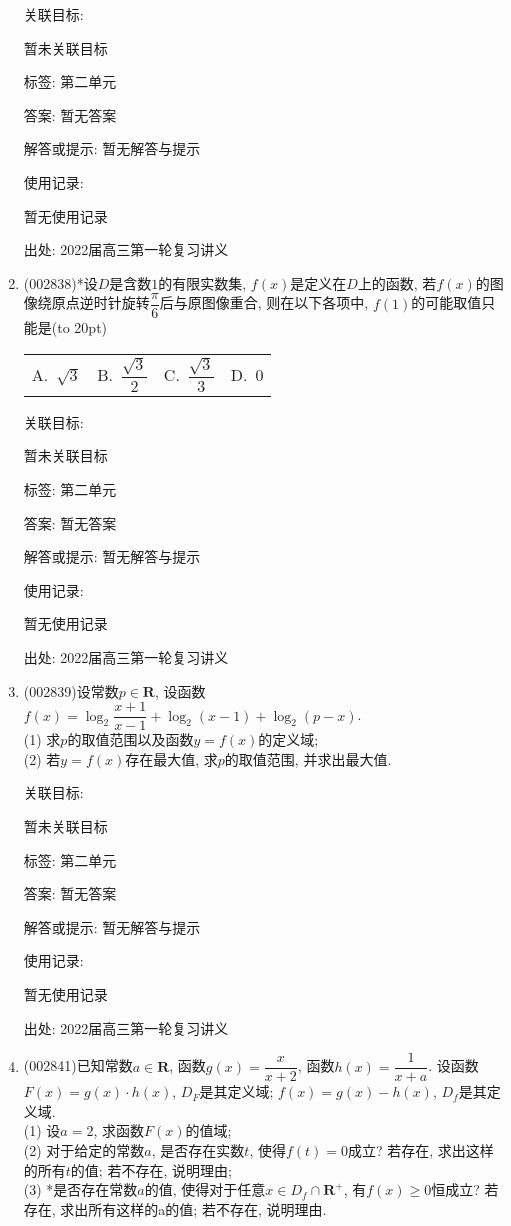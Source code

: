 \documentclass[10pt,a4paper]{article}
\newcommand{\bracket}[1]{(\hbox to #1pt{})}
\newcommand{\fourch}[4]{\par\begin{tabular}{p{.23\textwidth}p{.23\textwidth}p{.23\textwidth}p{.23\textwidth}}
A.~#1 &B.~#2& C.~#3& D.~#4
\end{tabular}}
\begin{document}
\begin{enumerate}[1.]
关联目标:

暂未关联目标



标签: 第二单元

答案: 暂无答案

解答或提示: 暂无解答与提示

使用记录:

暂无使用记录


出处: 2022届高三第一轮复习讲义
\item { (002838)}*设$D$是含数$1$的有限实数集, $f(x)$是定义在$D$上的函数, 若$f(x)$的图像绕原点逆时针旋转$\dfrac \pi6$后与原图像重合, 则在以下各项中, $f(1)$的可能取值只能是\bracket{20}
\fourch{$\sqrt3$}{$\dfrac{\sqrt{3}}2$}{$\dfrac{\sqrt{3}}3$}{$0$}


关联目标:

暂未关联目标



标签: 第二单元

答案: 暂无答案

解答或提示: 暂无解答与提示

使用记录:

暂无使用记录


出处: 2022届高三第一轮复习讲义
\item { (002839)}设常数$p\in \mathbf{R}$, 设函数$f(x)=\log_2\dfrac{x+1}{x-1}+\log_2(x-1)+\log_2(p-x)$.\\
(1) 求$p$的取值范围以及函数$y=f(x)$的定义域;\\
(2) 若$y=f(x)$存在最大值, 求$p$的取值范围, 并求出最大值.


关联目标:

暂未关联目标



标签: 第二单元

答案: 暂无答案

解答或提示: 暂无解答与提示

使用记录:

暂无使用记录


出处: 2022届高三第一轮复习讲义
\item { (002841)}已知常数$a\in \mathbf{R}$, 函数$g(x)=\dfrac x{x+2}$, 函数$h(x)=\dfrac 1{x+a}$. 设函数$F(x)=g(x)\cdot h(x)$, $D_F$是其定义域; $f(x)=g(x)-h(x)$, $D_f$是其定义域.\\
(1) 设$a=2$, 求函数$F(x)$的值域;\\
(2) 对于给定的常数$a$, 是否存在实数$t$, 使得$f(t)=0$成立? 若存在, 求出这样的所有$t$的值; 若不存在, 说明理由;\\
(3) *是否存在常数$a$的值, 使得对于任意$x\in {D_f}\cap \mathbf{R}^+$, 有$f(x)\ge 0$恒成立? 若存在, 求出所有这样的a的值; 若不存在, 说明理由.



\end{enumerate}
\end{document}
